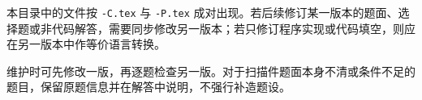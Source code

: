 
\begin{question}
本目录中的文件按 \texttt{-C.tex} 与 \texttt{-P.tex} 成对出现。若后续修订某一版本的题面、选择题或非代码解答，需要同步修改另一版本；若只修订程序实现或代码填空，则应在另一版本中作等价语言转换。
\begin{solution}
维护时可先修改一版，再逐题检查另一版。对于扫描件题面本身不清或条件不足的题目，保留原题信息并在解答中说明，不强行补造题设。
\end{solution}
\end{question}

